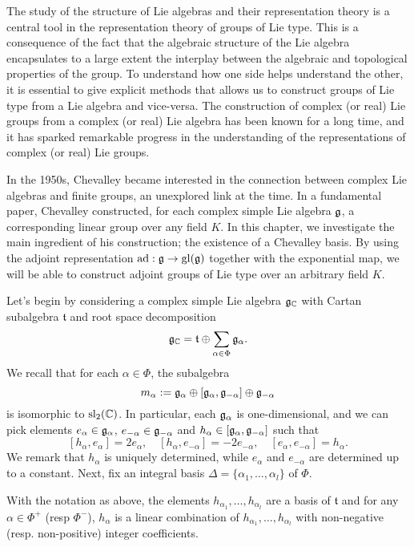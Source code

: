 The study of the structure of Lie algebras and their representation theory is a central tool in the representation theory of groups of Lie type. This is a consequence of the fact that the algebraic structure of the Lie algebra encapsulates to a large extent the interplay between the algebraic and topological properties of the group. To understand how one side helps understand the other, it is essential to give explicit methods that allows us to construct groups of Lie type from a Lie algebra and vice-versa. The construction of complex (or real) Lie groups from a complex (or real) Lie algebra has been known for a long time, and it has sparked remarkable progress in the understanding of the representations of complex (or real) Lie groups. 

In the 1950s, Chevalley became interested in the connection between complex Lie algebras and finite groups, an unexplored link at the time. In a fundamental paper, Chevalley constructed, for each complex simple Lie algebra $\mathfrak{g}$, a corresponding linear group over any field $K$. In this chapter, we investigate the main ingredient of his construction; the existence of a Chevalley basis. By using the adjoint representation $\mathrm{ad}:\mathfrak{g}\to\mathrm{gl}(\mathfrak{g})$ together with the exponential map, we will be able to construct adjoint groups of Lie type over an arbitrary field $K$. 

Let's begin by considering a complex simple Lie algebra $\mathfrak{g}_{\mathbb{C}}$ with Cartan subalgebra $\mathfrak{t}$ and root space decomposition 
$$\mathfrak{g}_{\mathbb{C}}=\mathfrak{t}\oplus\sum_{\alpha\in\Phi}\mathfrak{g}_\alpha.$$
We recall that for each $\alpha\in\Phi$, the subalgebra
$$m_\alpha:=\mathfrak{g}_\alpha\oplus[\mathfrak{g}_\alpha,\mathfrak{g}_{-\alpha}]\oplus\mathfrak{g}_{-\alpha}$$
is isomorphic to $\mathrm{sl}_2(\mathbb{C})$. In particular, each $\mathfrak{g}_\alpha$ is one-dimensional, and we can pick elements $e_\alpha\in\mathfrak{g}_\alpha$, $e_{-\alpha}\in\mathfrak{g}_{-\alpha}$ and $h_\alpha\in[\mathfrak{g}_\alpha,\mathfrak{g}_{-\alpha}]$ such that 
$$[h_\alpha,e_\alpha]=2e_\alpha,\quad[h_\alpha,e_{-\alpha}]=-2e_{-\alpha},\quad[e_\alpha,e_{-\alpha}]=h_\alpha.$$
We remark that $h_\alpha$ is uniquely determined, while $e_\alpha$ and $e_{-\alpha}$ are determined up to a constant. Next, fix an integral basis $\Delta=\{\alpha_1,\ldots,\alpha_l\}$ of $\Phi$.

\begin{lemma}
    With the notation as above, the elements $h_{\alpha_1},\ldots,h_{\alpha_l}$ are a basis of $\mathfrak{t}$ and for any $\alpha\in\Phi^+$ (resp $\Phi^-$), $h_\alpha$ is a linear combination of $h_{\alpha_1},\ldots,h_{\alpha_l}$ with non-negative (resp. non-positive) integer coefficients.
\end{lemma}

